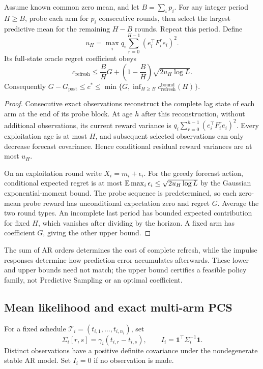 \begin{proposition}
Assume known common zero mean, and let $B=\sum_i p_i$. For any integer period $H\geq B$, probe each arm for $p_i$ consecutive rounds, then select the largest predictive mean for the remaining $H-B$ rounds. Repeat this period. Define
\begin{equation}
u_H=\max_i q_i\sum_{r=0}^{H-1}(e_i^\top F_i^re_i)^2.
\end{equation}
Its full-state oracle regret coefficient obeys
\begin{equation}
\boxed{c_{\mathrm{refresh}}\leq
\frac BH G+\left(1-\frac BH\right)\sqrt{2u_H\log L}.}
\label{ar_p_bandits:eq:refresh}
\end{equation}
Consequently $G-G_{\mathrm{past}}\leq c^*\leq\min\{G,\inf_{H\geq B}c_{\mathrm{refresh}}^{\mathrm{bound}}(H)\}$.
\end{proposition}
\begin{proof}
Consecutive exact observations reconstruct the complete lag state of each arm at the end of its probe block. At age $h$ after this reconstruction, without additional observations, its current reward variance is
$q_i\sum_{r=0}^{h-1}(e_i^\top F_i^re_i)^2$. Every exploitation age is at most $H$, and subsequent selected observations can only decrease forecast covariance. Hence conditional residual reward variances are at most $u_H$.

On an exploitation round write $X_i=m_i+\epsilon_i$. For the greedy forecast action, conditional expected regret is at most $\mathbb E\max_i\epsilon_i\leq\sqrt{2u_H\log L}$ by the Gaussian exponential-moment bound. The probe sequence is predetermined, so each zero-mean probe reward has unconditional expectation zero and regret $G$. Average the two round types. An incomplete last period has bounded expected contribution for fixed $H$, which vanishes after dividing by the horizon. A fixed arm has coefficient $G$, giving the other upper bound.
\end{proof}
The sum of AR orders determines the cost of complete refresh, while the impulse responses determine how prediction error accumulates afterwards. These lower and upper bounds need not match; the upper bound certifies a feasible policy family, not Predictive Sampling or an optimal coefficient.

\subsection{Mean likelihood and exact multi-arm PCS}
For a fixed schedule $\mathcal T_i=(t_{i,1},\ldots,t_{i,n_i})$, set
\begin{equation}
\Sigma_i[r,s]=\gamma_i(t_{i,r}-t_{i,s}),\qquad
I_i=\mathbf1^\top\Sigma_i^{-1}\mathbf1.
\label{ar_p_bandits:eq:info}
\end{equation}
Distinct observations have a positive definite covariance under the nondegenerate stable AR model. Set $I_i=0$ if no observation is made.

